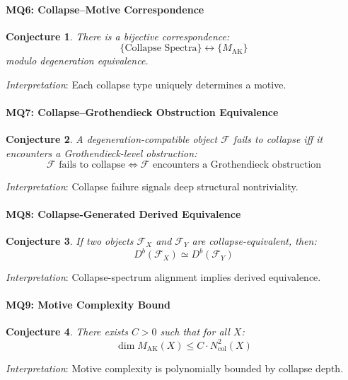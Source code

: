 \documentclass[11pt]{article}
\newtheorem{conjecture}{Conjecture}[section]
\begin{document}
\bigskip

\paragraph{MQ6: Collapse–Motive Correspondence}
\begin{conjecture}
There is a bijective correspondence:
\[
\{ \text{Collapse Spectra} \} \longleftrightarrow \{ M_{\mathrm{AK}} \}
\]
modulo degeneration equivalence.
\end{conjecture}
\textit{Interpretation}: Each collapse type uniquely determines a motive.

\bigskip

\paragraph{MQ7: Collapse–Grothendieck Obstruction Equivalence}
\begin{conjecture}
A degeneration-compatible object $\mathcal{F}$ fails to collapse iff it encounters a Grothendieck-level obstruction:
\[
\text{$\mathcal{F}$ fails to collapse} \iff \text{$\mathcal{F}$ encounters a Grothendieck obstruction}
\]
\end{conjecture}
\textit{Interpretation}: Collapse failure signals deep structural nontriviality.

\bigskip

\paragraph{MQ8: Collapse-Generated Derived Equivalence}
\begin{conjecture}
If two objects $\mathcal{F}_X$ and $\mathcal{F}_Y$ are collapse-equivalent, then:
\[
D^b(\mathcal{F}_X) \simeq D^b(\mathcal{F}_Y)
\]
\end{conjecture}
\textit{Interpretation}: Collapse-spectrum alignment implies derived equivalence.

\bigskip

\paragraph{MQ9: Motive Complexity Bound}
\begin{conjecture}
There exists $C > 0$ such that for all $X$:
\[
\dim M_{\mathrm{AK}}(X) \leq C \cdot N_{\mathrm{col}}^2(X)
\]
\end{conjecture}
\textit{Interpretation}: Motive complexity is polynomially bounded by collapse depth.
\end{document}
